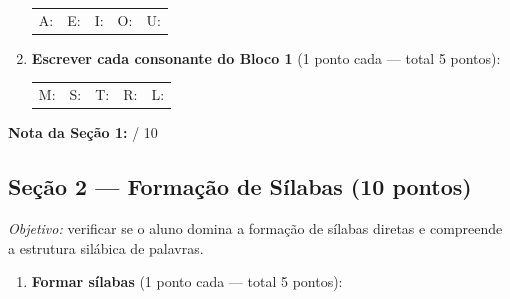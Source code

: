 \begin{avaliacao}
\begin{enumerate}
  \begin{center}
  \begin{tabular}{ccccc}
    A: \underline{\hspace{1.5cm}} &
    E: \underline{\hspace{1.5cm}} &
    I: \underline{\hspace{1.5cm}} &
    O: \underline{\hspace{1.5cm}} &
    U: \underline{\hspace{1.5cm}} \\
  \end{tabular}
  \end{center}

  \item \textbf{Escrever cada consonante do Bloco 1} (1 ponto cada — total 5 pontos):

  \begin{center}
  \begin{tabular}{ccccc}
    M: \underline{\hspace{1.5cm}} &
    S: \underline{\hspace{1.5cm}} &
    T: \underline{\hspace{1.5cm}} &
    R: \underline{\hspace{1.5cm}} &
    L: \underline{\hspace{1.5cm}} \\
  \end{tabular}
  \end{center}
\end{enumerate}

\medskip
\noindent\textbf{Nota da Seção 1:} \underline{\hspace{1cm}} / 10

\subsection*{Seção 2 — Formação de Sílabas (10 pontos)}

\textit{Objetivo:} verificar se o aluno domina a forma\c{c}\~{a}o de
s\'{i}labas diretas e compreende a estrutura sil\'{a}bica de palavras.

\begin{enumerate}[resume]
  \item \textbf{Formar s\'{i}labas} (1 ponto cada — total 5 pontos):

  \begin{center}
  \end{center}


\end{enumerate}
\end{avaliacao}
